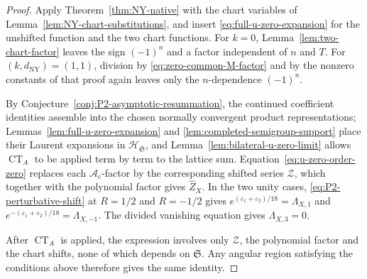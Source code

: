 \documentclass{amsart}
\theoremstyle{definition}
\numberwithin{equation}{section}
\newcommand{\eps}{\varepsilon}
\begin{document}
\begin{proof}
Apply Theorem~\ref{thm:NY-native} with the chart variables of Lemma~\ref{lem:NY-chart-substitutions}, and insert \eqref{eq:full-u-zero-expansion} for the unshifted function and the two chart functions.  For \(k=0\), Lemma~\ref{lem:two-chart-factor} leaves the sign \((-1)^n\) and a factor independent of \(n\) and \(T\).  For \((k,d_{\mathrm{NY}})=(1,1)\), division by \eqref{eq:zero-common-M-factor} and by the nonzero constants of that proof again leaves only the \(n\)-dependence \((-1)^n\).

By Conjecture~\ref{conj:P2-asymptotic-resummation}, the continued coefficient identities assemble into the chosen normally convergent product representations; Lemmas~\ref{lem:full-u-zero-expansion} and \ref{lem:completed-semigroup-support} place their Laurent expansions in \(\mathscr H_{\mathfrak S}\), and Lemma~\ref{lem:bilateral-u-zero-limit} allows \(\operatorname{CT}_A\) to be applied term by term to the lattice sum.  Equation~\eqref{eq:u-zero-order-zero} replaces each \(\mathscr A_{\mathrm c}\)-factor by the corresponding shifted series \(\mathcal Z\), which together with the polynomial factor gives \(\widehat Z_X\).  In the two unity cases, \eqref{eq:P2-perturbative-shift} at \(R=1/2\) and \(R=-1/2\) gives \(e^{(\eps_1+\eps_2)/18}=\Lambda_{X,1}\) and \(e^{-(\eps_1+\eps_2)/18}=\Lambda_{X,-1}\).  The divided vanishing equation gives \(\Lambda_{X,3}=0\).

After \(\operatorname{CT}_A\) is applied, the expression involves only \(\mathcal Z\), the polynomial factor and the chart shifts, none of which depends on \(\mathfrak S\).  Any angular region satisfying the conditions above therefore gives the same identity.
\end{proof}
\end{document}
